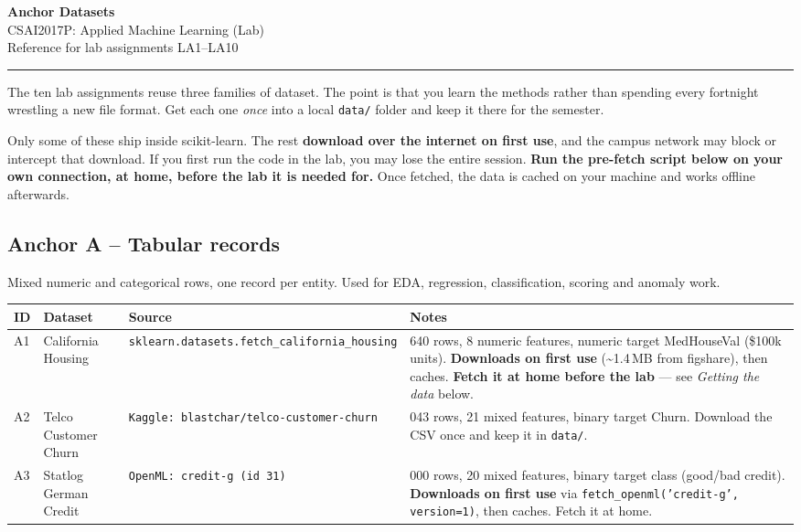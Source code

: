 \documentclass[11pt,a4paper]{article}
\newcommand{\CourseCode}{CSAI2017P: Applied Machine Learning (Lab)}
\begin{document}
\begin{center}{\LARGE\textbf{Anchor Datasets}}\\[0.25em]{\large \CourseCode}\\[0.25em]\normalsize Reference for lab assignments LA1--LA10\end{center}\vspace{0.4em}\hrule\vspace{0.8em}

The ten lab assignments reuse three families of dataset. The point is that you learn the methods rather than spending every fortnight wrestling a new file format. Get each one \emph{once} into a local \texttt{data/} folder and keep it there for the semester.

\begin{warnbox}Only some of these ship inside scikit-learn. The rest \textbf{download over the internet on first use}, and the campus network may block or intercept that download. If you first run the code in the lab, you may lose the entire session. \textbf{Run the pre-fetch script below on your own connection, at home, before the lab it is needed for.} Once fetched, the data is cached on your machine and works offline afterwards.\end{warnbox}

\subsection*{Anchor A -- Tabular records}
Mixed numeric and categorical rows, one record per entity. Used for EDA, regression, classification, scoring and anomaly work.\\[0.3em]
\begin{center}\footnotesize\begin{tabular}{@{}p{0.7cm}>{\raggedright\arraybackslash}p{3.1cm}>{\raggedright\arraybackslash}p{4.1cm}>{\raggedright\arraybackslash}p{6.4cm}@{}}\toprule\textbf{ID} & \textbf{Dataset} & \textbf{Source} & \textbf{Notes}\\
\midrule
A1 & California Housing & \texttt{\footnotesize sklearn.datasets.fetch\_california\_housing} & 20{,}640 rows, 8 numeric features, numeric target MedHouseVal (\$100k units). \textbf{Downloads on first use} (\textasciitilde1.4\,MB from figshare), then caches. \textbf{Fetch it at home before the lab} --- see \emph{Getting the data} below.\\
A2 & Telco Customer Churn & \texttt{\footnotesize Kaggle: blastchar/telco-customer-churn} & 7{,}043 rows, 21 mixed features, binary target Churn. Download the CSV once and keep it in \texttt{data/}.\\
A3 & Statlog German Credit & \texttt{\footnotesize OpenML: credit-g (id 31)} & 1{,}000 rows, 20 mixed features, binary target class (good/bad credit). \textbf{Downloads on first use} via \texttt{fetch\_openml('credit-g', version=1)}, then caches. Fetch it at home.\\
\bottomrule\end{tabular}\end{center}
\end{document}
